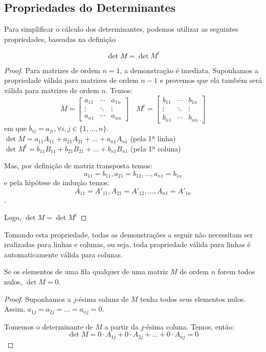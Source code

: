 \subsection{Propriedades do Determinantes}
Para simplificar o cálculo dos determinantes, podemos utilizar as seguintes propriedades, baseadas na definição 

\begin{prop}
\[\det M = \det M^t\]
\begin{proof}
Para matrizes de ordem $n=1$, a demonstração é imediata. Suponhamos a propriedade válida para matrizes de ordem $n-1$ e provemos que ela também será válida para matrizes de ordem $n$. Temos:
\[M=\begin{bmatrix}
a_{11} & \cdots & a_{1n} \\
\vdots & \ddots & \vdots \\
a_{n1} & \cdots & a_{nn}
\end{bmatrix} \quad M^t=\begin{bmatrix}
b_{11} & \cdots & b_{1n} \\
\vdots & \ddots & \vdots \\
b_{n1} & \cdots & b_{nn}
\end{bmatrix}\]
em que $b_{ij}=a_{ji}, \forall i,j \in \{1,\dots,n\}$.\\
$\det M =a_{11}A_{11} + a_{21}A_{21}+\dots +a_{n1}A_{n1}$ (pela 1ª linha)\\
$\det M^t =b_{11}B_{11} + b_{21}B_{21}+\dots +b_{n1}B_{n1}$ (pela 1ª coluna)\par 
Mas, por definição de matriz transposta temos: \[a_{11}=b_{11}, a_{21}=b_{12}, \dots, a_{n1}=b_{1n}\] e pela hipótese de indução temos: \[A_{11}=A'_{11}, A_{21}=A'_{12},\dots,A_{n1}=A'_{1n}\]. \par 
Logo, $\det M = \det M^t$
\end{proof}
Tomando esta propriedade, todas as demonstrações a seguir não necessitam ser realizadas para linhas e colunas, ou seja, toda propriedade válida para linhas é automaticamente válida para colunas.
\end{prop}

\begin{prop}
Se os elementos de uma fila qualquer de uma matriz $M$ de ordem $n$ forem todos nulos, $\det M =0$.
\begin{proof}
Suponhamos a $j$-ésima coluna de $M$ tenha todos seus elementos nulos. Assim, $a_{1j}=a_{2j}=\dots=a_{nj}=0$. \par 
Tomemos o determinante de $M$ a partir da $j$-ésima coluna. Temos, então:
\[\det M= 0\cdot A_{1j}+0\cdot A_{2j}+\dots +0\cdot A_{nj}=0\]
\end{proof}
\end{prop}

